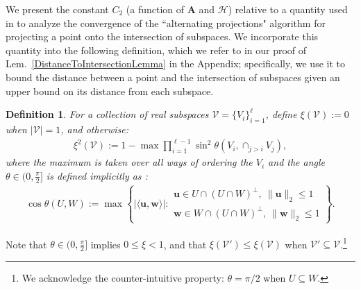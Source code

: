\documentclass[journal, twocolumn]{IEEEtran}
\newtheorem{lemma}{Lemma}
\newtheorem{definition}{Definition}
\begin{document}


We present the constant $C_2$ (a function of $\mathbf{A}$ and $\mathcal{H}$) relative to a quantity used in \cite{Deutsch12} to analyze the convergence of the ``alternating projections" algorithm for projecting a point onto the intersection of subspaces. We incorporate this quantity into the following definition, which we refer to in our proof of Lem.~\ref{DistanceToIntersectionLemma} in the Appendix; specifically, we use it to bound the distance between a point and the intersection of subspaces given an upper bound on its distance from each subspace.

\begin{definition}\label{FriedrichsDefinition}
For a collection of real subspaces $\mathcal{V} = \{V_i\}_{i=1}^\ell$, define $\xi(\mathcal{V}) := 0$ when $|\mathcal{V}| = 1$, and otherwise:
\begin{align}\label{xi}
\xi^2(\mathcal{V}) := 1 -  \max \prod_{i=1}^{\ell-1} \sin^2  \theta \left(V_i, \cap_{j>i} V_j \right) ,
\end{align} 
%
where the maximum is taken over all ways of ordering 
the $V_i$ and the angle $\theta \in (0,\frac{\pi}{2}]$ is defined implicitly as \cite[Def.~9.4]{Deutsch12}:
\begin{align*}
\cos{\theta(U,W)} := \max\left\{ |\langle \mathbf{u}, \mathbf{w} \rangle|: \substack{ \mathbf{u} \in U \cap (U \cap W)^\perp, \ \|\mathbf{u}\|_2 \leq 1 \\ \mathbf{w} \in W \cap (U \cap W)^\perp, \  \|\mathbf{w}\|_2 \leq 1 } \right\}.
\end{align*}
\end{definition}
Note that $\theta \in (0,\frac{\pi}{2}]$ implies $0 \leq \xi < 1$, and that $\xi(\mathcal{V}') \leq \xi(\mathcal{V})$ when $\mathcal{V}' \subseteq \mathcal{V}$.\footnote{We acknowledge the counter-intuitive property: $\theta =  \pi/2$ when $U \subseteq W$.}  
\end{document}
